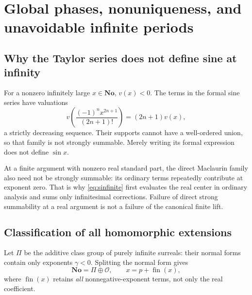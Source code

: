 \documentclass[11pt,letterpaper]{article}
\theoremstyle{definition}
\theoremstyle{remark}
\newcommand{\No}{\mathbf{No}}
\newcommand{\OO}{\mathcal O}\newcommand{\mm}{\mathfrak m}
\newcommand{\fin}{\operatorname{fin}}
\numberwithin{equation}{section}
\begin{document}
\section{Global phases, nonuniqueness, and unavoidable infinite periods}\label{sec:global}
\subsection{Why the Taylor series does not define sine at infinity}
For a nonzero infinitely large $x\in\No$, $v(x)<0$. The terms in the formal sine series have valuations
\[
 v\left(\frac{(-1)^n x^{2n+1}}{(2n+1)!}\right)=(2n+1)v(x),
\]
a strictly decreasing sequence. Their supports cannot have a well-ordered union, so that family is not strongly summable. Merely writing its formal expression does not define $\sin x$.

At a finite argument with nonzero real standard part, the direct Maclaurin family also need not be strongly summable: its ordinary terms repeatedly contribute at exponent zero. That is why \eqref{eq:sinfinite} first evaluates the real center in ordinary analysis and sums only infinitesimal corrections. Failure of direct strong summability at a real argument is not a failure of the canonical finite lift.

\subsection{Classification of all homomorphic extensions}
Let $\Pi$ be the additive class group of purely infinite surreals: their normal forms contain only exponents $\gamma<0$. Splitting the normal form gives
\begin{equation}\label{eq:puresplit}
 \No=\Pi\oplus\OO,
 \qquad x=p+\fin(x),
\end{equation}
where $\fin(x)$ retains \emph{all} nonnegative-exponent terms, not only the real coefficient.
\end{document}
